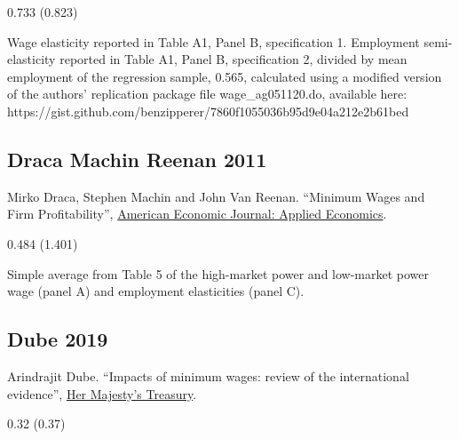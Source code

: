 \vspace{0.7em}

 0.733 (0.823)

\vspace{0.7em}

 Wage elasticity reported in Table A1, Panel B, specification 1. Employment semi-elasticity reported in Table A1, Panel B, specification 2, divided by mean employment of the regression sample, 0.565, calculated using a modified version of the authors' replication package file wage\_ag051120.do, available here: https://gist.github.com/benzipperer/7860f1055036b95d9e04a212e2b61bed

\subsection*{Draca Machin Reenan 2011}
\vspace{-0.7em}

\noindent Mirko Draca, Stephen Machin and John Van Reenan. ``Minimum Wages and Firm Profitability'', \href{https://doi.org/10.1257/app.3.1.129}{American Economic Journal: Applied Economics}.

\vspace{0.7em}

 0.484 (1.401)

\vspace{0.7em}

 Simple average from Table 5 of the high-market power and low-market power wage (panel A) and employment elasticities (panel C).

\subsection*{Dube 2019}
\vspace{-0.7em}

\noindent Arindrajit Dube. ``Impacts of minimum wages: review of the international evidence'', \href{https://assets.publishing.service.gov.uk/government/uploads/system/uploads/attachment_data/file/844350/impacts_of_minimum_wages_review_of_the_international_evidence_Arindrajit_Dube_web.pdf}{Her Majesty's Treasury}.

\vspace{0.7em}

 0.32 (0.37)

